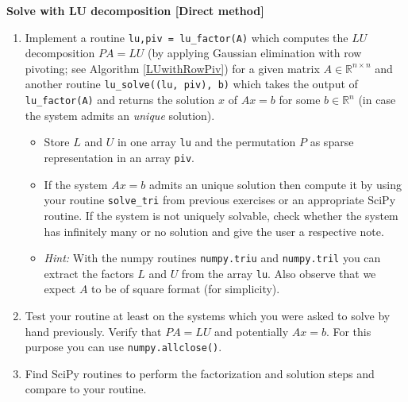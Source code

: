 \textbf{Solve with LU decomposition [Direct method]}
\begin{enumerate}
	\item Implement a routine \texttt{lu,piv = lu\_factor(A)} which computes the $LU$ decomposition $PA = LU$ (by applying Gaussian elimination with row pivoting; see Algorithm \ref{LUwithRowPiv}) for a given matrix $A \in \mathbb{R}^{n\times n}$ and another routine \texttt{lu\_solve((lu, piv), b)} which takes the output of \texttt{lu\_factor(A)} and returns the solution $x$ of $Ax=b$ for some $b\in \mathbb{R}^{n}$ (in case the system admits an \textit{unique} solution).
	\begin{itemize}
		\item Store $L$ and $U$ in one array \texttt{lu} and the permutation $P$ as sparse representation in an array \texttt{piv}.
		\item If the system $Ax=b$ admits an unique solution then compute it by using your routine \texttt{solve\_tri} from previous exercises or an appropriate SciPy routine. If the system is not uniquely solvable, check whether the system has infinitely many or no solution and give the user a respective note.
		\item \textit{Hint:} With the numpy routines \texttt{numpy.triu} and \texttt{numpy.tril} you can extract the factors $L$ and $U$ from the array \texttt{lu}. Also observe that we expect $A$ to be of square format (for simplicity).		
	\end{itemize}
\item Test your routine at least on the systems which you were asked to solve by hand previously. Verify that $PA = LU$ and potentially $Ax = b$. For this purpose you can use \texttt{numpy.allclose()}. %
\item Find SciPy routines to perform the factorization and solution steps and compare to your routine.
\end{enumerate}


